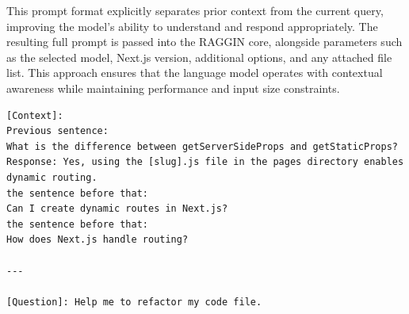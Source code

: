 This prompt format explicitly separates prior context from the current query, improving the model’s ability to understand and respond appropriately. The resulting full prompt is passed into the RAGGIN core, alongside parameters such as the selected model, Next.js version, additional options, and any attached file list. This approach ensures that the language model operates with contextual awareness while maintaining performance and input size constraints.

\begin{lstlisting}[caption=Full prompt after optimizing]
[Context]: 
Previous sentence: 
What is the difference between getServerSideProps and getStaticProps?
Response: Yes, using the [slug].js file in the pages directory enables dynamic routing.
the sentence before that: 
Can I create dynamic routes in Next.js?
the sentence before that: 
How does Next.js handle routing?

---

[Question]: Help me to refactor my code file.
\end{lstlisting}


%
%







